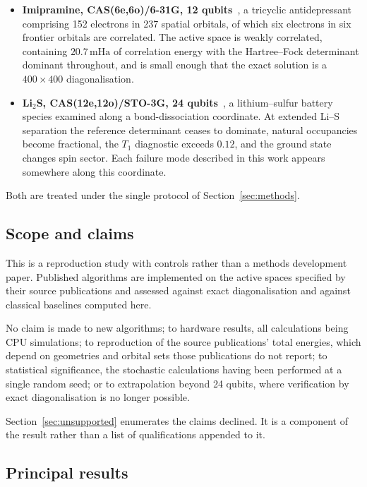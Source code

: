 \documentclass[11pt,a4paper]{article}
\newcommand{\mHa}{\ensuremath{\,\mathrm{mHa}}}
\newcommand{\LiS}{\texorpdfstring{Li$_2$S}{Li2S}}
\begin{document}
\begin{itemize}[leftmargin=1.2em,itemsep=3pt]
\item \textbf{Imipramine, CAS(6e,6o)/6-31G, 12 qubits}~\cite{koziell}, a
tricyclic antidepressant comprising 152 electrons in 237 spatial orbitals, of
which six electrons in six frontier orbitals are correlated. The active space
is weakly correlated, containing $20.7\mHa$ of correlation energy with the
Hartree--Fock determinant dominant throughout, and is small enough that the
exact solution is a $400 \times 400$ diagonalisation.

\item \textbf{\LiS, CAS(12e,12o)/STO-3G, 24 qubits}~\cite{hivqe}, a
lithium--sulfur battery species examined along a bond-dissociation coordinate.
At extended Li--S separation the reference determinant ceases to dominate,
natural occupancies become fractional, the $T_1$ diagnostic exceeds $0.12$, and
the ground state changes spin sector. Each failure mode described in this work
appears somewhere along this coordinate.
\end{itemize}

Both are treated under the single protocol of Section~\ref{sec:methods}.

\subsection{Scope and claims}

This is a reproduction study with controls rather than a methods development
paper. Published algorithms are implemented on the active spaces specified by
their source publications and assessed against exact diagonalisation and
against classical baselines computed here.

No claim is made to new algorithms; to hardware results, all calculations being
CPU simulations; to reproduction of the source publications' total energies,
which depend on geometries and orbital sets those publications do not report;
to statistical significance, the stochastic calculations having been performed
at a single random seed; or to extrapolation beyond 24 qubits, where
verification by exact diagonalisation is no longer possible.

Section~\ref{sec:unsupported} enumerates the claims declined. It is a component
of the result rather than a list of qualifications appended to it.

\subsection{Principal results}
\label{sec:results}
\end{document}
